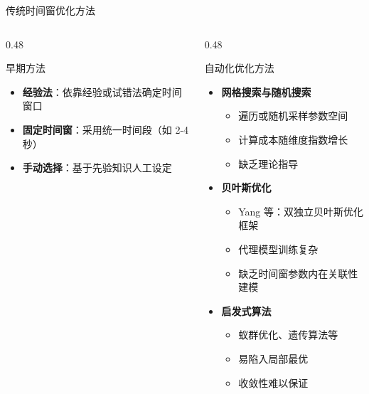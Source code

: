 \begin{frame}{传统时间窗优化方法}
    \begin{columns}[T]
        \begin{column}{0.48\textwidth}
            \begin{block}{\normalsize 早期方法}
                \begin{itemize}
                    \item \textbf{经验法}：依靠经验或试错法确定时间窗口
                    \item \textbf{固定时间窗}：采用统一时间段（如 2-4 秒）
                    \item \textbf{手动选择}：基于先验知识人工设定
                \end{itemize}
            \end{block}
        \end{column}

        \begin{column}{0.48\textwidth}
            \begin{alertblock}{\normalsize 自动化优化方法}
                \begin{itemize}
                    \item \textbf{网格搜索与随机搜索}
                    \begin{itemize}
                        \item 遍历或随机采样参数空间
                        \item 计算成本随维度指数增长
                        \item 缺乏理论指导
                    \end{itemize}

                    \item \textbf{贝叶斯优化}
                    \begin{itemize}
                        \item Yang 等：双独立贝叶斯优化框架
                        \item 代理模型训练复杂
                        \item 缺乏时间窗参数内在关联性建模
                    \end{itemize}

                    \item \textbf{启发式算法}
                    \begin{itemize}
                        \item 蚁群优化、遗传算法等
                        \item 易陷入局部最优
                        \item 收敛性难以保证
                    \end{itemize}
                \end{itemize}
            \end{alertblock}
        \end{column}
    \end{columns}
\end{frame}

